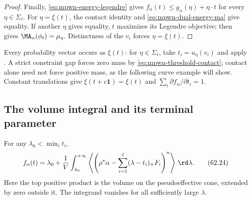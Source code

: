 \begin{proof}
Finally, \eqref{eq:mpwn-energy-legendre} gives
$f_\alpha(t)\leq g_\alpha(\eta)+\eta\cdot t$ for every $\eta\in\Sigma_\ell$.
For $\eta=\xi(t)$, the contact identity and \eqref{eq:mpwn-dual-energy-ma} give equality. If another $\eta$ gives equality, $t$ maximizes its Legendre objective;  then gives $\MA_\alpha(\phi_t)=\mu_\eta$. Distinctness of the $v_i$ forces $\eta=\xi(t)$.
\end{proof}

Every probability vector occurs as $\xi(t)$: for $\eta\in\Sigma_\ell$, take $t_i=u_\eta(v_i)$ and apply . A strict constraint gap forces zero mass by \eqref{eq:mpwn-threshold-contact}; contact alone need not force positive mass, as the following curve example will show. Constant translations give $\xi(t+c\mathbf1)=\xi(t)$ and $\sum_i\partial f_\alpha/\partial t_i=1$.

\subsection{The volume integral and its terminal parameter}
\label{subsec:mpwn-k-volume-integral}

\noindent\begin{minipage}{\linewidth}
\begin{theorem}\label{thm:mpwn-volume-formula}
For any $\lambda_0<\min_i t_i$,
\[
 f_\alpha(t)
 =\lambda_0+\frac1V\int_{\lambda_0}^{+\infty}
     \left\langle
       \left(\rho^*\alpha-
         \sum_{i=1}^{\ell}(\lambda-t_i)_+F_i\right)^n
     \right\rangle\,\rd\lambda.
\tag{62.24}\label{eq:mpwn-volume-formula}
\]
Here the top positive product is the volume on the pseudoeffective
cone, extended by zero outside it.  The integrand vanishes for all
sufficiently large $\lambda$.
\end{theorem}
\end{minipage}\par


